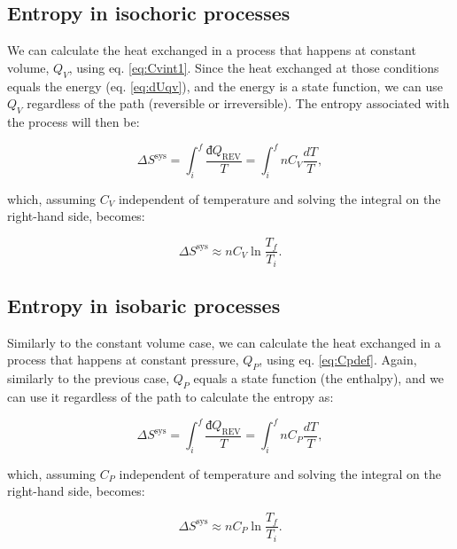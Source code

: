 \documentclass[
  9pt,
]{extbook}
\theoremstyle{definition}
\theoremstyle{definition}
\theoremstyle{definition}
\theoremstyle{definition}
\theoremstyle{remark}
\begin{document}
\subsection{Entropy in isochoric processes}\label{entropy-in-isochoric-processes}

We can calculate the heat exchanged in a process that happens at constant volume, \(Q_V\), using eq. \eqref{eq:Cvint1}. Since the heat exchanged at those conditions equals the energy (eq. \eqref{eq:dUqv}), and the energy is a state function, we can use \(Q_V\) regardless of the path (reversible or irreversible). The entropy associated with the process will then be:

\begin{equation}
\Delta S^{\mathrm{sys}} = \int_i^f \frac{đQ_{\mathrm{REV}}}{T} = \int_i^f nC_V \frac{dT}{T},
\label{eq:sconstV1}
\end{equation}

which, assuming \(C_V\) independent of temperature and solving the integral on the right-hand side, becomes:

\begin{equation}
\Delta S^{\mathrm{sys}} \approx n C_V \ln \frac{T_f}{T_i}.
\label{eq:sconstV}
\end{equation}

\subsection{Entropy in isobaric processes}\label{entropy-in-isobaric-processes}

Similarly to the constant volume case, we can calculate the heat exchanged in a process that happens at constant pressure, \(Q_P\), using eq. \eqref{eq:Cpdef}. Again, similarly to the previous case, \(Q_P\) equals a state function (the enthalpy), and we can use it regardless of the path to calculate the entropy as:

\begin{equation}
\Delta S^{\mathrm{sys}} = \int_i^f \frac{đQ_{\mathrm{REV}}}{T} = \int_i^f nC_P \frac{dT}{T},
\label{eq:sconstP1}
\end{equation}

which, assuming \(C_P\) independent of temperature and solving the integral on the right-hand side, becomes:

\begin{equation}
\Delta S^{\mathrm{sys}} \approx n C_P \ln \frac{T_f}{T_i}.
\label{eq:sconstP}
\end{equation}
\end{document}

